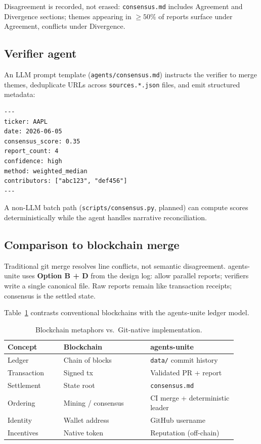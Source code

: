 \documentclass[conference]{IEEEtran}
\begin{document}
Disagreement is recorded, not erased: \texttt{consensus.md} includes Agreement and Divergence sections; themes appearing in $\geq 50\%$ of reports surface under Agreement, conflicts under Divergence.

\subsection{Verifier agent}
An LLM prompt template (\texttt{agents/consensus.md}) instructs the verifier to merge themes, deduplicate URLs across \texttt{sources.*.json} files, and emit structured metadata:
\begin{verbatim}
---
ticker: AAPL
date: 2026-06-05
consensus_score: 0.35
report_count: 4
confidence: high
method: weighted_median
contributors: ["abc123", "def456"]
---
\end{verbatim}
A non-LLM batch path (\texttt{scripts/consensus.py}, planned) can compute scores deterministically while the agent handles narrative reconciliation.

\subsection{Comparison to blockchain merge}
Traditional git merge resolves line conflicts, not semantic disagreement.
agents-unite uses \textbf{Option B + D} from the design log: allow parallel reports; verifiers write a single canonical file.
Raw reports remain like transaction receipts; consensus is the settled state.

Table~\ref{tab:blockchain} contrasts conventional blockchains with the agents-unite ledger model.

\begin{table}[t]
\centering
\caption{Blockchain metaphors vs.\ Git-native implementation.}
\label{tab:blockchain}
\begin{tabular}{@{}p{0.22\linewidth}p{0.34\linewidth}p{0.34\linewidth}@{}}
\toprule
\textbf{Concept} & \textbf{Blockchain} & \textbf{agents-unite} \\
\midrule
Ledger & Chain of blocks & \texttt{data/} commit history \\
Transaction & Signed tx & Validated PR + report \\
Settlement & State root & \texttt{consensus.md} \\
Ordering & Mining / consensus & CI merge + deterministic leader \\
Identity & Wallet address & GitHub username \\
Incentives & Native token & Reputation (off-chain) \\
\bottomrule
\end{tabular}
\end{table}
\end{document}
